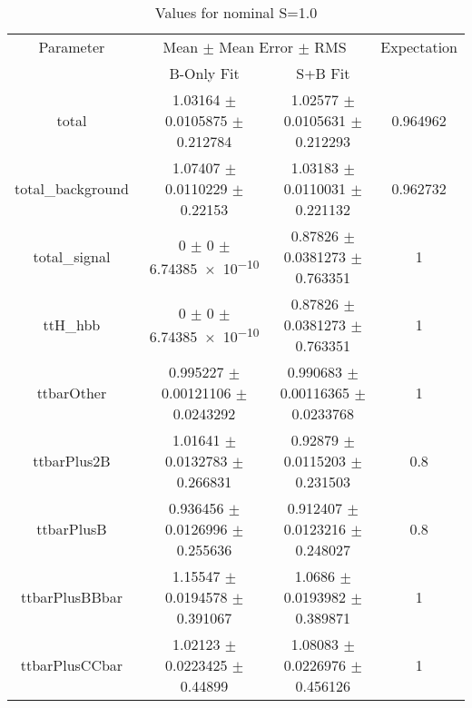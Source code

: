 \begin{table}
\centering
\caption{Values for nominal S=1.0}
\begin{tabular}{cccc}
\toprule
Parameter & \multicolumn{2}{c}{Mean $\pm$ Mean Error $\pm$ RMS} & Expectation\\
 & B-Only Fit & S+B Fit & \\
\midrule
total & \num{1.03164} $\pm$ \num{0.0105875} $\pm$ \num{0.212784} & \num{1.02577} $\pm$ \num{0.0105631} $\pm$ \num{0.212293} & \num{0.964962}\\
total\_background & \num{1.07407} $\pm$ \num{0.0110229} $\pm$ \num{0.22153} & \num{1.03183} $\pm$ \num{0.0110031} $\pm$ \num{0.221132} & \num{0.962732}\\
total\_signal & \num{0} $\pm$ \num{0} $\pm$ \num{6.74385e-10} & \num{0.87826} $\pm$ \num{0.0381273} $\pm$ \num{0.763351} & \num{1}\\
ttH\_hbb & \num{0} $\pm$ \num{0} $\pm$ \num{6.74385e-10} & \num{0.87826} $\pm$ \num{0.0381273} $\pm$ \num{0.763351} & \num{1}\\
ttbarOther & \num{0.995227} $\pm$ \num{0.00121106} $\pm$ \num{0.0243292} & \num{0.990683} $\pm$ \num{0.00116365} $\pm$ \num{0.0233768} & \num{1}\\
ttbarPlus2B & \num{1.01641} $\pm$ \num{0.0132783} $\pm$ \num{0.266831} & \num{0.92879} $\pm$ \num{0.0115203} $\pm$ \num{0.231503} & \num{0.8}\\
ttbarPlusB & \num{0.936456} $\pm$ \num{0.0126996} $\pm$ \num{0.255636} & \num{0.912407} $\pm$ \num{0.0123216} $\pm$ \num{0.248027} & \num{0.8}\\
ttbarPlusBBbar & \num{1.15547} $\pm$ \num{0.0194578} $\pm$ \num{0.391067} & \num{1.0686} $\pm$ \num{0.0193982} $\pm$ \num{0.389871} & \num{1}\\
ttbarPlusCCbar & \num{1.02123} $\pm$ \num{0.0223425} $\pm$ \num{0.44899} & \num{1.08083} $\pm$ \num{0.0226976} $\pm$ \num{0.456126} & \num{1}\\
\bottomrule
\end{tabular}
\end{table}